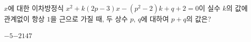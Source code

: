 $x$에 대한 이차방정식 $x^2+k(2p-3)x-(p^2-2)k+q+2=0$이 실수 $k$의 값에 관계없이 항상 $1$을 근으로 가질 때, 두 상수 $p$, $q$에 대하여 $p+q$의 값은?
\begin{choices32}{$-5$}{$-2$}{$1$}{$4$}{$7$}\end{choices32}
